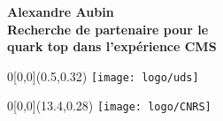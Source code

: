 \newpage
\singlespace
\thispagestyle{empty}
\begin{center}
\textbf{\Large{Alexandre Aubin}}\\
\textbf{\Large{Recherche de partenaire pour le\\
quark top dans l'expérience CMS\\\vspace*{0.3cm}}}
\end{center}
\begin{textblock}{0}[0,0](0.5,0.32)
{
    \setlength{\fboxsep}{0.7pt}
    \setlength{\fboxrule}{1pt}
    \texttt{[image: logo/uds]}
}
\end{textblock}
\begin{textblock}{0}[0,0](13.4,0.28)
{
    \setlength{\fboxsep}{0.7pt}
    \setlength{\fboxrule}{1pt}
    \texttt{[image: logo/CNRS]}
}
\end{textblock}
\small
